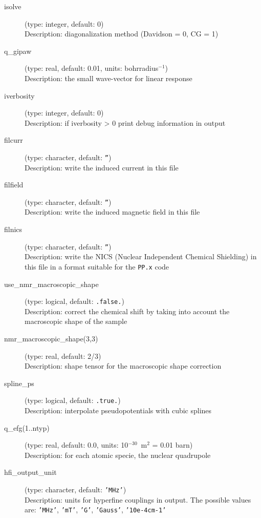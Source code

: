 \documentclass[a4paper,11pt,twoside]{article}
\begin{document}
\begin{description}
\item[isolve] (type: integer, default: 0)\\
Description: diagonalization method (Davidson = 0, CG = 1)

\item[q\_gipaw] (type: real, default: 0.01, units: bohrradius$^{-1}$)\\
Description: the small wave-vector for linear response

\item[iverbosity] (type: integer, default: 0)\\
Description: if iverbosity {\textgreater} 0 print debug information in output

\item[filcurr] (type: character, default: \texttt{''})\\
Description: write the induced current in this file

\item[filfield] (type: character, default: \texttt{''})\\
Description: write the induced magnetic field in this file

\item[filnics] (type: character, default: \texttt{''})\\
Description: write the NICS (Nuclear Independent Chemical Shielding) in this file
in a format suitable for the \texttt{PP.x} code

\item[use\_nmr\_macroscopic\_shape] (type: logical, default: \texttt{.false.})\\
Description: correct the chemical shift by taking into account the
macroscopic shape of the sample

\item[nmr\_macroscopic\_shape(3,3)] (type: real, default: 2/3)\\
Description: shape tensor for the macroscopic shape correction

\item[spline\_ps] (type: logical, default: \texttt{.true.})\\
Description: interpolate pseudopotentials with cubic splines

\item[q\_efg(1..ntyp)] (type: real, default: 0.0, units: 10$^{-30}$~m$^2$ = 0.01 barn)\\
Description: for each atomic specie, the nuclear quadrupole

\item[hfi\_output\_unit] (type: character, default: \texttt{'MHz'})\\
Description: units for hyperfine couplings in output. The possible values are: 
\texttt{'MHz'}, \texttt{'mT'}, \texttt{'G'}, \texttt{'Gauss'}, \texttt{'10e-4cm-1'}


\end{description}
\end{document}
